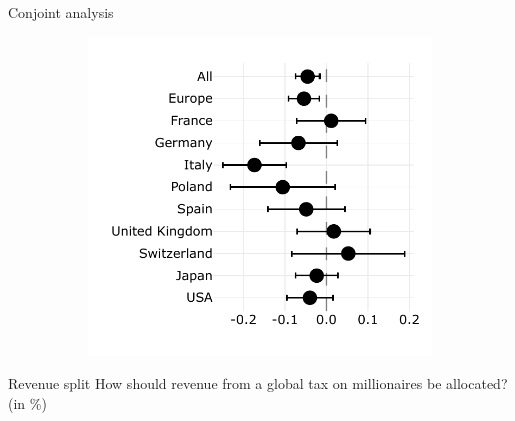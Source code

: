 \documentclass[aspectratio=169,xcolor=dvipsnames, 11pt,mathserif]{beamer}
\begin{document}
\begin{frame}{Conjoint analysis}
\begin{figure}
\begin{subfigure}{.48\textwidth}
  \includegraphics[width=\textwidth]{../figures/country_comparison/program_preferred_by_cut_aid_in_program.pdf}
\end{subfigure}
\end{figure}
\end{frame}

\begin{frame}{Revenue split}
\centering How should revenue from a global tax on millionaires be allocated? (in \%)
\end{frame}
\end{document}
